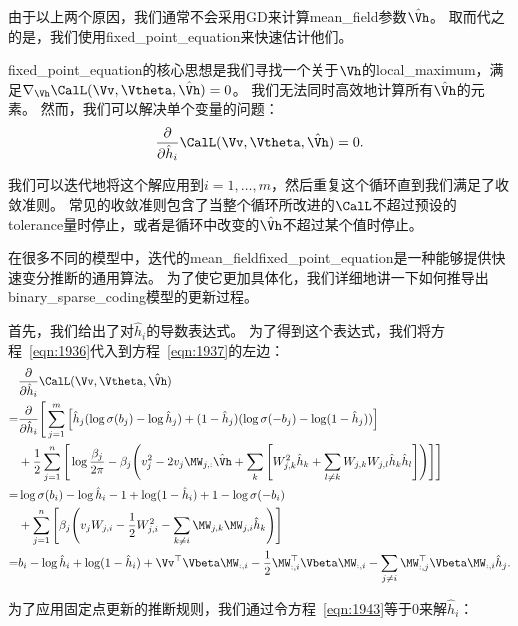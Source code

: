 由于以上两个原因，我们通常不会采用\gls{GD}来计算\gls{mean_field}参数$\hat{\Vh}$。
取而代之的是，我们使用\gls{fixed_point_equation}来快速估计他们。


\gls{fixed_point_equation}的核心思想是我们寻找一个关于$\Vh$的\gls{local_maximum}，满足$\nabla_{\Vh}\CalL(\Vv,\Vtheta,\hat{\Vh}) = 0$。
我们无法同时高效地计算所有$\hat{\Vh}$的元素。
然而，我们可以解决单个变量的问题：
\begin{align}
\label{eqn:1937}
\frac{\partial}{\partial \hat{h}_i} \CalL(\Vv,\Vtheta,\hat{\Vh}) = 0 .
\end{align}


我们可以迭代地将这个解应用到$i = 1,\ldots,m$，然后重复这个循环直到我们满足了收敛准则。
常见的收敛准则包含了当整个循环所改进的$\CalL$不超过预设的\gls{tolerance}量时停止，或者是循环中改变的$\hat{\Vh}$不超过某个值时停止。

在很多不同的模型中，迭代的\gls{mean_field}\gls{fixed_point_equation}是一种能够提供快速变分推断的通用算法。
为了使它更加具体化，我们详细地讲一下如何推导出\gls{binary_sparse_coding}模型的更新过程。


首先，我们给出了对$\hat{h}_i$的导数表达式。
为了得到这个表达式，我们将方程~\eqref{eqn:1936}代入到方程~\eqref{eqn:1937}的左边：
\begin{align}
& \frac{\partial}{\partial \hat{h}_i} \CalL (\Vv,\Vtheta,\hat{\Vh})    \\
= & \frac{\partial}{\partial \hat{h}_i} \Bigg[\sum_{j=1}^{m}\Big[\hat{h}_j (\log \sigma(b_j) - \log \hat{h}_j) + (1 - \hat{h}_j)(\log \sigma(-b_j) - \log (1-\hat{h}_j))\Big] \\
& + \frac{1}{2} \sum_{j=1}^{n} \Bigg[ \log {\frac{\beta_j}{2\pi}} - \beta_j \Bigg(v_j^2 - 2 v_j \MW_{j,:}\hat{\Vh} + \sum_{k}\Bigg[W^2_{j,k}\hat{h}_k + \sum_{l \neq k}W_{j,k}W_{j,l}\hat{h}_k\hat{h}_l \Bigg] \Bigg) \Bigg]\Bigg] \\
= & \log \sigma(b_i) - \log \hat{h}_i - 1 + \log (1 - \hat{h}_i ) + 1 - \log \sigma (- b_i ) \\
 & + \sum_{j=1}^{n} \Bigg[\beta_j \Bigg(v_j W_{j,i} - \frac{1}{2} W_{j,i}^2 - \sum_{k \neq i} \MW_{j,k}\MW_{j,i} \hat{h}_k\Bigg) \Bigg]\\
 = & b_i - \log \hat{h}_i + \log (1 - \hat{h}_i ) + \Vv^{\top} {\Vbeta} \MW_{:,i} - \frac{1}{2} \MW_{:,i}^{\top} {\Vbeta}\MW_{:,i} -\sum_{j\neq i}\MW^{\top}_{:,j}{\Vbeta}\MW_{:,i}\hat{h}_j.
 \label{eqn:1943}
\end{align}

为了应用固定点更新的推断规则，我们通过令方程~\eqref{eqn:1943}等于$0$来解$\hat{h}_i$：

